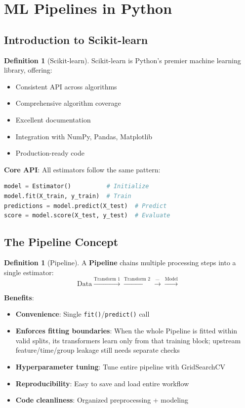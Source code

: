 \documentclass[11pt,twoside]{article}
\numberwithin{equation}{section}
\theoremstyle{plain}
\theoremstyle{definition}
\newtheorem{definition}[theorem]{Definition}
\theoremstyle{remark}
\begin{document}
\section{ML Pipelines in Python}
\label{sec:pipelines}

\subsection{Introduction to Scikit-learn}

\begin{definition}[Scikit-learn]
Scikit-learn is Python's premier machine learning library, offering:
\begin{itemize}
\item Consistent API across algorithms
\item Comprehensive algorithm coverage
\item Excellent documentation
\item Integration with NumPy, Pandas, Matplotlib
\item Production-ready code
\end{itemize}

\textbf{Core API}: All estimators follow the same pattern:
\begin{lstlisting}[language=Python]
model = Estimator()          # Initialize
model.fit(X_train, y_train)  # Train
predictions = model.predict(X_test)  # Predict
score = model.score(X_test, y_test)  # Evaluate
\end{lstlisting}
\end{definition}

\subsection{The Pipeline Concept}

\begin{definition}[Pipeline]
A \textbf{Pipeline} chains multiple processing steps into a single estimator:
\[
\text{Data} \xrightarrow{\text{Transform 1}} \xrightarrow{\text{Transform 2}} \xrightarrow{\cdots} \xrightarrow{\text{Model}}
\]

\textbf{Benefits}:
\begin{itemize}
\item \textbf{Convenience}: Single \texttt{fit()}/\texttt{predict()} call
\item \textbf{Enforces fitting boundaries}: When the whole Pipeline is fitted within valid splits, its transformers learn only from that training block; upstream feature/time/group leakage still needs separate checks
\item \textbf{Hyperparameter tuning}: Tune entire pipeline with GridSearchCV
\item \textbf{Reproducibility}: Easy to save and load entire workflow
\item \textbf{Code cleanliness}: Organized preprocessing + modeling
\end{itemize}
\end{definition}
\end{document}
